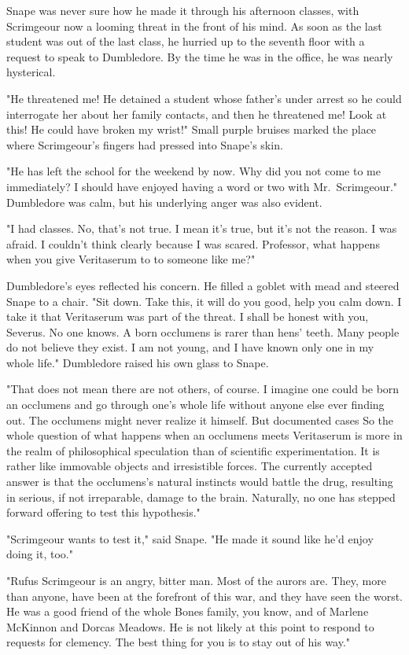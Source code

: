 Snape was never sure how he made it through his afternoon classes, with Scrimgeour now a looming threat in the front of his mind. As soon as the last student was out of the last class, he hurried up to the seventh floor with a request to speak to Dumbledore. By the time he was in the office, he was nearly hysterical.

"He threatened me! He detained a student whose father's under arrest so he could interrogate her about her family contacts, and then he threatened me! Look at this! He could have broken my wrist!" Small purple bruises marked the place where Scrimgeour's fingers had pressed into Snape's skin.

"He has left the school for the weekend by now. Why did you not come to me immediately? I should have enjoyed having a word or two with Mr.~Scrimgeour." Dumbledore was calm, but his underlying anger was also evident.

"I had classes. No, that's not true. I mean it's true, but it's not the reason. I was afraid. I couldn't think clearly because I was scared. Professor, what happens when you give{\el} Veritaserum to{\el} to someone like me?"

Dumbledore's eyes reflected his concern. He filled a goblet with mead and steered Snape to a chair. "Sit down. Take this, it will do you good, help you calm down. I take it that Veritaserum was part of the threat. I shall be honest with you, Severus. No one knows. A born occlumens is rarer than hens' teeth. Many people do not believe they exist. I am not young, and I have known only one in my whole life." Dumbledore raised his own glass to Snape.

"That does not mean there are not others, of course. I imagine one could be born an occlumens and go through one's whole life without anyone else ever finding out. The occlumens might never realize it himself. But documented cases{\el} So the whole question of what happens when an occlumens meets Veritaserum is more in the realm of philosophical speculation than of scientific experimentation. It is rather like immovable objects and irresistible forces. The currently accepted answer is that the occlumens's natural instincts would battle the drug, resulting in serious, if not irreparable, damage to the brain. Naturally, no one has stepped forward offering to test this hypothesis."

"Scrimgeour wants to test it," said Snape. "He made it sound like he'd enjoy doing it, too."

"Rufus Scrimgeour is an angry, bitter man. Most of the aurors are. They, more than anyone, have been at the forefront of this war, and they have seen the worst. He was a good friend of the whole Bones family, you know, and of Marlene McKinnon and Dorcas Meadows. He is not likely at this point to respond to requests for clemency. The best thing for you is to stay out of his way."

